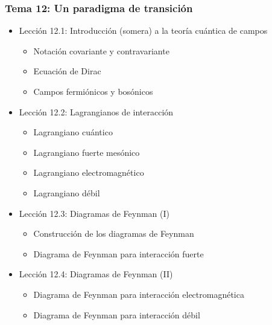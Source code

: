 \documentclass[a4paper,12pt,twoside]{article}
\begin{document}
\subsubsection*{Tema 12: Un paradigma de transición}
\begin{itemize}
\item Lección 12.1: Introducción (somera) a la teoría cuántica de campos
\begin{itemize}
\item Notación covariante y contravariante
\item Ecuación de Dirac
\item Campos fermiónicos y bosónicos
\end{itemize}
\item Lección 12.2: Lagrangianos de interacción
\begin{itemize}
\item Lagrangiano cuántico
\item Lagrangiano fuerte mesónico
\item Lagrangiano electromagnético
\item Lagrangiano débil
\end{itemize}
\item Lección 12.3: Diagramas de Feynman (I)
\begin{itemize}
\item Construcción de los diagramas de Feynman
\item Diagrama de Feynman para interacción fuerte
\end{itemize}
\item Lección 12.4: Diagramas de Feynman (II)
\begin{itemize}
\item Diagrama de Feynman para interacción electromagnética
\item Diagrama de Feynman para interacción débil
\end{itemize}
\end{itemize}
\end{document}
